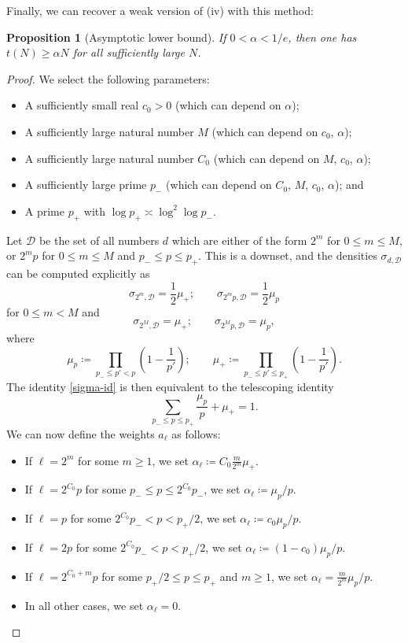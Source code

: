 \documentclass[10pt,a4paper,reqno]{amsart}
\numberwithin{equation}{section}
\theoremstyle{plain}
\newtheorem{proposition}[theorem]{Proposition}
\theoremstyle{definition}
\begin{document}
Finally, we can recover a weak version of (iv) with this method:

\begin{proposition}[Asymptotic lower bound]\label{asymp}  If $0 < \alpha < 1/e$, then one has $t(N) \geq \alpha N$ for all sufficiently large $N$.
\end{proposition}

\begin{proof}  We select the following parameters:
  \begin{itemize}
  \item A sufficiently small real $c_0>0$ (which can depend on $\alpha$);
  \item A sufficiently large natural number $M$ (which can depend on $c_0$, $\alpha$);
  \item A sufficiently large natural number $C_0$ (which can depend on $M$, $c_0$, $\alpha$);
  \item A sufficiently large prime $p_-$ (which can depend on $C_0$, $M$, $c_0$, $\alpha$); and
  \item A prime $p_+$ with $\log p_+ \asymp \log^2 \log p_-$.
  \end{itemize}
Let ${\mathcal D}$ be the set of all numbers $d$ which are either of the form $2^m$ for $0 \leq m \leq M$, or $2^m p$ for $0 \leq m \leq M$ and $p_- \leq p \leq p_+$.  This is a downset, and the densities $\sigma_{d,{\mathcal D}}$ can be computed explicitly as
$$ \sigma_{2^m,{\mathcal D}} = \frac{1}{2} \mu_+; \qquad \sigma_{2^m p,{\mathcal D}} = \frac{1}{2} \mu_p$$
for $0 \leq m < M$ and
$$ \sigma_{2^M,{\mathcal D}} = \mu_+; \qquad \sigma_{2^M p,{\mathcal D}} = \mu_p,$$
where
$$ \mu_p \coloneqq \prod_{p_- \leq p' < p} \left( 1 - \frac{1}{p'} \right); \qquad \mu_+ \coloneqq \prod_{p_- \leq p' \leq p_+} \left( 1 - \frac{1}{p'} \right).$$
The identity \eqref{sigma-id} is then equivalent to the telescoping identity
\begin{equation}\label{telescope}
   \sum_{p_- \leq p \leq p_+} \frac{\mu_p}{p} + \mu_+ = 1.
\end{equation}
We can now define the weights $a_\ell$ as follows:
\begin{itemize}
\item[(i)] If $\ell = 2^m$ for some $m \geq 1$, we set $\alpha_\ell \coloneqq C_0 \frac{m}{2^m} \mu_+$.
\item[(ii)] If $\ell = 2^{C_0} p$ for some $p_- \leq p \leq 2^{C_0} p_-$, we set $\alpha_\ell \coloneqq \mu_p/p$.
\item[(iii)] If $\ell = p$ for some $2^{C_0} p_- < p < p_+/2$, we set $\alpha_\ell \coloneqq c_0 \mu_p/p$.
\item[(iv)] If $\ell = 2p$ for some $2^{C_0} p_- < p < p_+/2$, we set $\alpha_\ell \coloneqq (1-c_0) \mu_p/p$.
\item[(v)] If $\ell = 2^{C_0+m} p$ for some $p_+/2 \leq p \leq p_+$ and $m \geq 1$, we set $\alpha_\ell = \frac{m}{2^m} \mu_p/p$.
\item[(vi)] In all other cases, we set $\alpha_\ell = 0$.
\end{itemize}


\end{proof}
\end{document}
